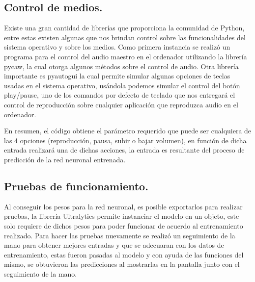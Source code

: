 \documentclass[a4paper, 12pt]{article}
\newcommand{\code}{code/audio.py}
\begin{document}
    \subsection{Control de medios.} 
    Existe una gran cantidad de librerías que proporciona la comunidad de Python, entre estas existen algunas que nos brindan control sobre las funcionalidades del sistema operativo y sobre los medios. Como primera instancia se realizó un programa para el control del audio maestro en el ordenador utilizando la librería pycaw, la cual otorga algunos métodos sobre el control de audio. Otra librería importante es pyautogui la cual permite simular algunas opciones de teclas usadas en el sistema operativo, usándola podemos simular el control del botón play/pause, uno de los comandos por defecto de teclado que nos entregará el control de reproducción sobre cualquier aplicación que reproduzca audio en el ordenador. 


     
    En resumen, el código obtiene el parámetro requerido que puede ser cualquiera de las 4 opciones (reproducción, pausa, subir o bajar volumen), en función de dicha entrada realizará una de dichas acciones, la entrada es resultante del proceso de predicción de la red neuronal entrenada. 

    \subsection{Pruebas de funcionamiento.} 
    Al conseguir los pesos para la red neuronal, es posible exportarlos para realizar pruebas, la librería Ultralytics permite instanciar el modelo en un objeto, este solo requiere de dichos pesos para poder funcionar de acuerdo al entrenamiento realizado. Para hacer las pruebas nuevamente se realizó un seguimiento de la mano para obtener mejores entradas y que se adecuaran con los datos de entrenamiento, estas fueron pasadas al modelo y con ayuda de las funciones del mismo, se obtuvieron las predicciones al mostrarlas en la pantalla junto con el seguimiento de la mano. 
\end{document}
